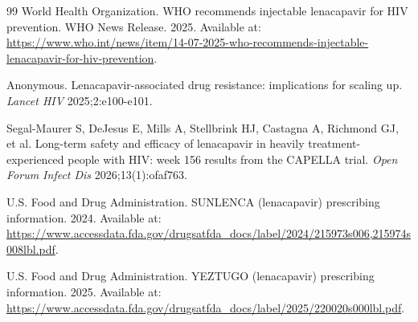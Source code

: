 \documentclass[12pt,a4paper]{article}
\begin{document}
\begin{thebibliography}{99}
 World Health Organization. WHO recommends injectable lenacapavir for HIV prevention. WHO News Release. 2025. Available at: \url{https://www.who.int/news/item/14-07-2025-who-recommends-injectable-lenacapavir-for-hiv-prevention}.

 Anonymous. Lenacapavir-associated drug resistance: implications for scaling up. \textit{Lancet HIV} 2025;2:e100-e101.




 Segal-Maurer S, DeJesus E, Mills A, Stellbrink HJ, Castagna A, Richmond GJ, et al. Long-term safety and efficacy of lenacapavir in heavily treatment-experienced people with HIV: week 156 results from the CAPELLA trial. \textit{Open Forum Infect Dis} 2026;13(1):ofaf763.


 U.S. Food and Drug Administration. SUNLENCA (lenacapavir) prescribing information. 2024. Available at: \url{https://www.accessdata.fda.gov/drugsatfda_docs/label/2024/215973s006,215974s008lbl.pdf}.

 U.S. Food and Drug Administration. YEZTUGO (lenacapavir) prescribing information. 2025. Available at: \url{https://www.accessdata.fda.gov/drugsatfda_docs/label/2025/220020s000lbl.pdf}.




\end{thebibliography}
\end{document}
